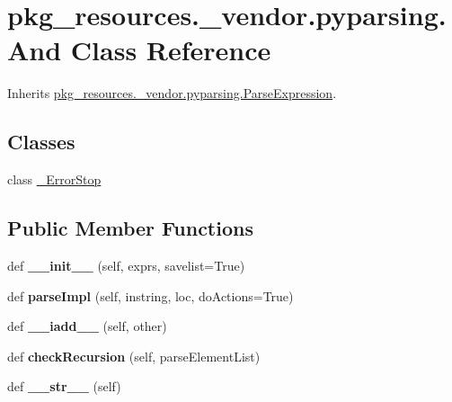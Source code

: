 \hypertarget{classpkg__resources_1_1__vendor_1_1pyparsing_1_1_and}{}\section{pkg\+\_\+resources.\+\_\+vendor.\+pyparsing.\+And Class Reference}
\label{classpkg__resources_1_1__vendor_1_1pyparsing_1_1_and}


Inherits \hyperlink{classpkg__resources_1_1__vendor_1_1pyparsing_1_1_parse_expression}{pkg\+\_\+resources.\+\_\+vendor.\+pyparsing.\+Parse\+Expression}.

\subsection*{Classes}
\begin{DoxyCompactItemize}
\item 
class \hyperlink{classpkg__resources_1_1__vendor_1_1pyparsing_1_1_and_1_1___error_stop}{\+\_\+\+Error\+Stop}
\end{DoxyCompactItemize}
\subsection*{Public Member Functions}
\begin{DoxyCompactItemize}
\item 
\mbox{\label{classpkg__resources_1_1__vendor_1_1pyparsing_1_1_and_a1b82c1bcfc776105763c4702e8986bea}} 
def {\bfseries \+\_\+\+\_\+init\+\_\+\+\_\+} (self, exprs, savelist=True)
\item 
\mbox{\label{classpkg__resources_1_1__vendor_1_1pyparsing_1_1_and_ac32523c030626202dde8714f0fe3a092}} 
def {\bfseries parse\+Impl} (self, instring, loc, do\+Actions=True)
\item 
\mbox{\label{classpkg__resources_1_1__vendor_1_1pyparsing_1_1_and_aab46d1c623b48f6b5556975df8b97aba}} 
def {\bfseries \+\_\+\+\_\+iadd\+\_\+\+\_\+} (self, other)
\item 
\mbox{\label{classpkg__resources_1_1__vendor_1_1pyparsing_1_1_and_afb57cdf369ab2c8b6410420ab31990ad}} 
def {\bfseries check\+Recursion} (self, parse\+Element\+List)
\item 
\mbox{\label{classpkg__resources_1_1__vendor_1_1pyparsing_1_1_and_a5bf261fd6d3b258fffd8bc8fdaba40eb}} 
def {\bfseries \+\_\+\+\_\+str\+\_\+\+\_\+} (self)
\end{DoxyCompactItemize}
